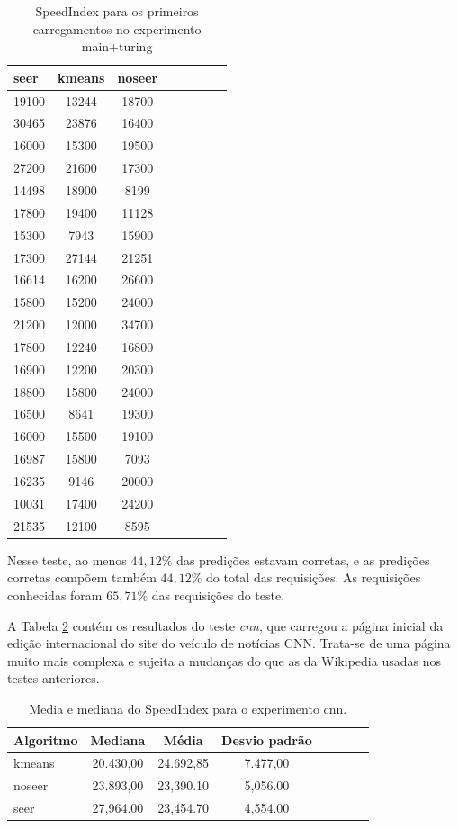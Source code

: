 \documentclass[10pt,twocolumn,letterpaper]{article}
\begin{document}
\begin{table}
\begin{center}
\begin{tabular}{l*{6}{c}r}
\hline
seer & kmeans & noseer \\
\hline
19100 & 13244 & 18700 \\
30465 & 23876 & 16400 \\
16000 & 15300 & 19500 \\
27200 & 21600 & 17300 \\
14498 & 18900 & 8199 \\
17800 & 19400 & 11128 \\
15300 & 7943 & 15900 \\
17300 & 27144 & 21251 \\
16614 & 16200 & 26600 \\
15800 & 15200 & 24000 \\
21200 & 12000 & 34700 \\
17800 & 12240 & 16800 \\
16900 & 12200 & 20300 \\
18800 & 15800 & 24000 \\
16500 & 8641 & 19300 \\
16000 & 15500 & 19100 \\
16987 & 15800 & 7093 \\
16235 & 9146 & 20000 \\
10031 & 17400 & 24200 \\
21535 & 12100 & 8595 \\
\end{tabular}
\end{center}
\caption{SpeedIndex para os primeiros carregamentos no experimento main+turing}
\label{tbl-main-turing-fvs}
\end{table}

Nesse teste, ao menos $44,12 \%$ das predições estavam corretas, e as predições corretas compõem também $44,12 \%$ do total das requisições. As requisições conhecidas foram $65,71 \%$ das requisições do teste.

A Tabela \ref{tbl-cnn} contém os resultados do teste \emph{cnn}, que carregou a página inicial da edição internacional do site do veículo de notícias CNN. Trata-se de uma página muito mais complexa e sujeita a mudanças do que as da Wikipedia usadas nos testes anteriores.

\begin{table}
\begin{center}
\begin{tabular}{l*{6}{c}r}
\hline
Algoritmo & Mediana & Média & Desvio padrão \\
\hline
kmeans & 20.430,00 & 24.692,85 & 7.477,00 \\
noseer & 23.893,00 & 23,390.10 & 5,056.00 \\
seer & 27,964.00 & 23,454.70 & 4,554.00 \\
\hline
\end{tabular}
\end{center}
\caption{Media e mediana do SpeedIndex para o experimento cnn.}
\label{tbl-cnn}
\end{table}
\end{document}

